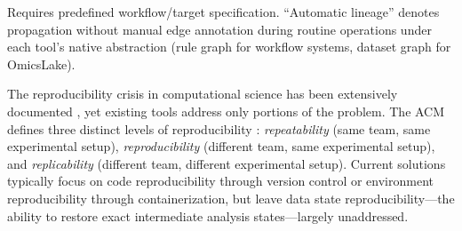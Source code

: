 \documentclass[11pt,a4paper]{article}
\begin{document}
\begin{table}[H]
\centering
\caption{Feature comparison of data versioning approaches for bioinformatics workflows}
\label{tab:tool_comparison}
\begingroup
\setlength{\tabcolsep}{3pt}
\renewcommand{\arraystretch}{1.05}
%
\endgroup
\vspace{2pt}
\begin{minipage}{\textwidth}
\footnotesize *Requires predefined workflow/target specification. ``Automatic lineage'' denotes propagation without manual edge annotation during routine operations under each tool's native abstraction (rule graph for workflow systems, dataset graph for OmicsLake).
\end{minipage}
\end{table}

The reproducibility crisis in computational science has been extensively documented \citep{baker2016reproducibility, fanelli2018opinion}, yet existing tools address only portions of the problem. The ACM defines three distinct levels of reproducibility \citep{acm2020artifact}: \emph{repeatability} (same team, same experimental setup), \emph{reproducibility} (different team, same experimental setup), and \emph{replicability} (different team, different experimental setup). Current solutions typically focus on code reproducibility through version control or environment reproducibility through containerization, but leave data state reproducibility---the ability to restore exact intermediate analysis states---largely unaddressed.
\end{document}
